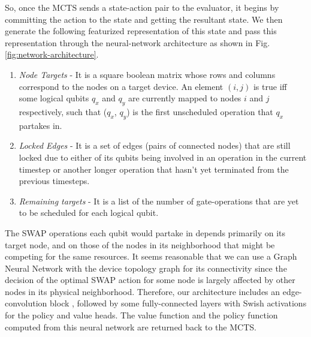 So, once the MCTS sends a state-action pair to the evaluator, it begins by committing the action to the state and getting the resultant state. We then generate the following featurized representation of this state and pass this representation through the neural-network architecture as shown in Fig. \ref{fig:network-architecture}.

\begin{enumerate}
    \item \textit{Node Targets} - It is a square boolean matrix whose rows and columns correspond to the nodes on a target device. An element $(i, j)$ is true iff some logical qubits $q_x$ and $q_y$ are currently mapped to nodes $i$ and $j$ respectively, such that ($q_x$, $q_y$) is the first unscheduled operation that $q_x$ partakes in.
    \item \textit{Locked Edges} - It is a set of edges (pairs of connected nodes) that are still locked due to either of its qubits being involved in an operation in the current timestep or another longer operation that hasn't yet terminated from the previous timesteps.
    \item \textit{Remaining targets} - It is a list of the number of gate-operations that are yet to be scheduled for each logical qubit. 
\end{enumerate}


The SWAP operations each qubit would partake in depends primarily on its target node, and on those of the nodes in its neighborhood that might be competing for the same resources. It seems reasonable that we can use a Graph Neural Network with the device topology graph for its connectivity since the decision of the optimal SWAP action for some node is largely affected by other nodes in its physical neighborhood. Therefore, our architecture includes an edge-convolution block \cite{nn_edge_conv}, followed by some fully-connected layers with Swish \cite{nn_swish} activations for the policy and value heads. The value function and the policy function computed from this neural network are returned back to the MCTS.



